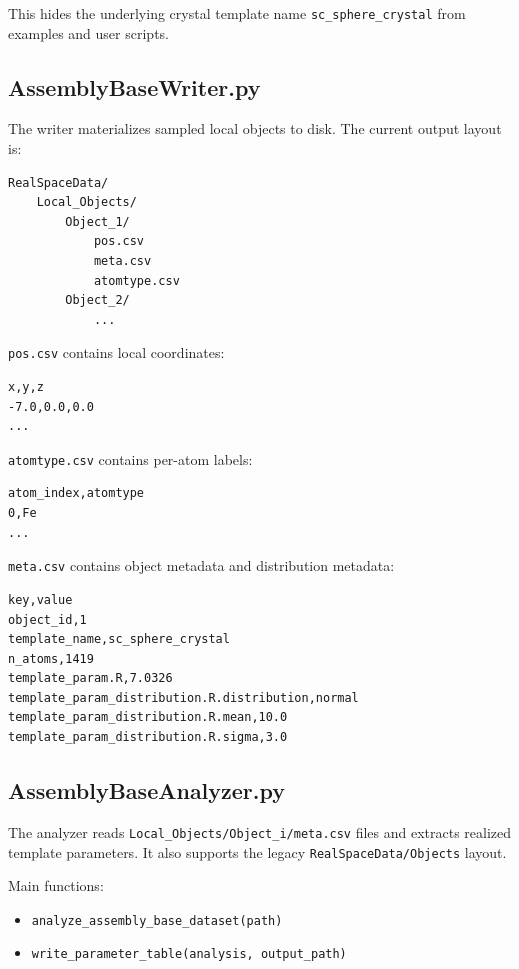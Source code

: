 \documentclass[11pt,a4paper]{article}
\begin{document}
This hides the underlying crystal template name
\texttt{sc\_sphere\_crystal} from examples and user scripts.

\subsection{AssemblyBaseWriter.py}

The writer materializes sampled local objects to disk. The current output
layout is:

\begin{lstlisting}
RealSpaceData/
    Local_Objects/
        Object_1/
            pos.csv
            meta.csv
            atomtype.csv
        Object_2/
            ...
\end{lstlisting}

\texttt{pos.csv} contains local coordinates:

\begin{lstlisting}
x,y,z
-7.0,0.0,0.0
...
\end{lstlisting}

\texttt{atomtype.csv} contains per-atom labels:

\begin{lstlisting}
atom_index,atomtype
0,Fe
...
\end{lstlisting}

\texttt{meta.csv} contains object metadata and distribution metadata:

\begin{lstlisting}
key,value
object_id,1
template_name,sc_sphere_crystal
n_atoms,1419
template_param.R,7.0326
template_param_distribution.R.distribution,normal
template_param_distribution.R.mean,10.0
template_param_distribution.R.sigma,3.0
\end{lstlisting}

\subsection{AssemblyBaseAnalyzer.py}

The analyzer reads \texttt{Local\_Objects/Object\_i/meta.csv} files and
extracts realized template parameters. It also supports the legacy
\texttt{RealSpaceData/Objects} layout.

Main functions:

\begin{itemize}[nosep]
    \item \texttt{analyze\_assembly\_base\_dataset(path)}
    \item \texttt{write\_parameter\_table(analysis, output\_path)}
\end{itemize}
\end{document}
